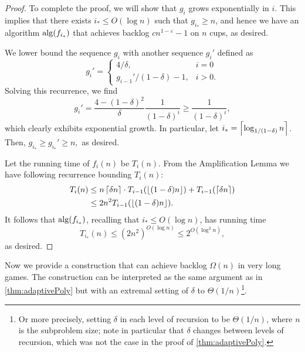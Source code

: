 \begin{proof}
  To complete the proof, we will show that $g_i$ grows
  exponentially in $i$. This implies that there exists $i_* \le
  O(\log n)$ such that $g_{i_*} \ge n$, and hence we have an
  algorithm $\operatorname{\text{\textup{alg}}}(f_{i_*})$ that achieves backlog
  $cn^{1-\varepsilon}-1$ on $n$ cups, as desired.
  
  We lower bound the sequence $g_i$ with another sequence $g_i'$
  defined as 
  $$g_i'=\begin{cases}
    4/\delta, & i=0\\
    g_{i-1}' / (1-\delta) -1, & i> 0.
  \end{cases}$$
  Solving this recurrence, we find 
  $$g_i' = \frac{4-(1-\delta)^2}{\delta} \frac{1}{(1-\delta)^i}
  \ge \frac{1}{(1-\delta)^i},$$
  which clearly exhibits exponential growth. 
  In particular, let $i_* = \left\lceil \log_{1/(1-\delta)} n \right\rceil$. Then,
  $g_{i_*} \ge g_{i_*}' \ge n,$ as desired.

  Let the running time of $f_i(n)$ be $T_i(n)$. From the
  Amplification Lemma we have following recurrence bounding
  $T_i(n)$:
  \begin{align*}
    T_i(n) &\le n\left\lceil \delta n \right\rceil \cdot T_{i-1}(\left\lfloor (1-\delta)n \right\rfloor) +
  T_{i-1}(\left\lceil \delta n \right\rceil) \\
  &\le 2n^2T_{i-1}(\left\lfloor (1-\delta)n \right\rfloor).
  \end{align*}
  It follows that $\operatorname{\text{\textup{alg}}}(f_{i_*})$, recalling that $i_* \le O(\log n)$, has running time
  $$T_{i_*}(n) \le (2n^2)^{O(\log n)} \le 2^{O(\log^2 n)},$$
  as desired.

\end{proof}

Now we provide a construction that can achieve backlog $\Omega(n)$
in very long games. The construction can be interpreted as the same
argument as in \cref{thm:adaptivePoly} but with an extremal setting of
$\delta$ to $\Theta(1/n)$\footnote{Or more precisely, setting
$\delta$ in each level of recursion to be $\Theta(1 / n)$, where
$n$ is the subproblem size; note in particular that $\delta$
changes between levels of recursion, which was not the case in
the proof of \cref{thm:adaptivePoly}.}.

